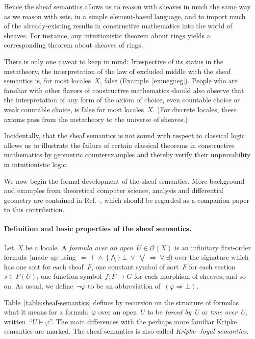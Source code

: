 \documentclass{ws-rv9x6}
\renewcommand{\O}{\mathcal{O}}
\renewcommand{\_}{\mathpunct{.}}
\newcommand{\?}{\,{:}\,}
\begin{document}
Hence the sheaf semantics allows us to reason with sheaves in much the same way
as we reason with sets, in a simple element-based language, and to import much
of the already-existing results in constructive mathematics into the world of
sheaves. For instance, any intuitionistic theorem about rings yields a
corresponding theorem about sheaves of rings.

There is only one caveat to keep in mind: Irrespective of its status in the
metatheory, the interpretation of the law of excluded middle with the sheaf
semantics is, for most locales~$X$, false (Example~\ref{ex:negneg}). People who
are familiar with other flavors of constructive mathematics should also observe
that the interpretation of any form of the axiom of choice, even countable
choice or weak countable choice, is false for most locales~$X$. (For discrete
locales, these axioms pass from the metatheory to the universe of sheaves.)

Incidentally, that the sheaf semantics is not sound with respect to classical
logic allows us to illustrate the failure of certain classical theorems in
constructive mathematics by geometric counterexamples and thereby verify their
unprovability in intuitionistic logic.

We now begin the formal development of the sheaf semantics. More background and
examples from theoretical computer science, analysis and differential geometry
are contained in Ref.~, which should be
regarded as a companion paper to this contribution.

\paragraph{Definition and basic properties of the sheaf semantics.}
Let~$X$ be a locale. A \emph{formula over an open~$U \in \O(X)$} is an
infinitary first-order formula (made up using~${=}\ {\top}\ {\wedge}\ \{\bigwedge\}\ {\bot}\ {\vee}\
{\bigvee}\ {\Rightarrow}\ {\forall}\ {\exists}$) over the signature which has one sort for
each sheaf~$F$, one constant symbol of sort~$F$ for each section~$s \in F(U)$,
one function symbol~$f : F \to G$ for each morphism of sheaves, and so on. As
usual, we define~$\neg\varphi$ to be an abbreviation of~$(\varphi \Rightarrow
\bot)$.

Table~\ref{table:sheaf-semantics} defines by recursion on the structure of
formulas what it means for a formula~$\varphi$ over an open~$U$ to be
\emph{forced by~$U$} or \emph{true over~$U$}, written~``$U \models \varphi$''. The
main differences with the perhaps more familiar Kripke semantics are marked.
The sheaf semantics is also called \emph{Kripke--Joyal semantics}.
\end{document}
